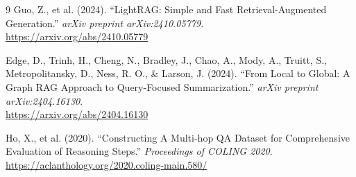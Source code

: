 \documentclass[11pt, a4paper]{article}
\begin{document}
\begin{thebibliography}{9}
Guo, Z., et al. (2024). 
``LightRAG: Simple and Fast Retrieval-Augmented Generation.'' 
\textit{arXiv preprint arXiv:2410.05779}. \\
\url{https://arxiv.org/abs/2410.05779}

Edge, D., Trinh, H., Cheng, N., Bradley, J., Chao, A., Mody, A., Truitt, S., Metropolitansky, D., Ness, R. O., \& Larson, J. (2024).
``From Local to Global: A Graph RAG Approach to Query-Focused Summarization.''
\textit{arXiv preprint arXiv:2404.16130}. \\
\url{https://arxiv.org/abs/2404.16130}

Ho, X., et al. (2020). 
``Constructing A Multi-hop QA Dataset for Comprehensive Evaluation of Reasoning Steps.'' 
\textit{Proceedings of COLING 2020}. \\
\url{https://aclanthology.org/2020.coling-main.580/}

\end{thebibliography}
\end{document}
